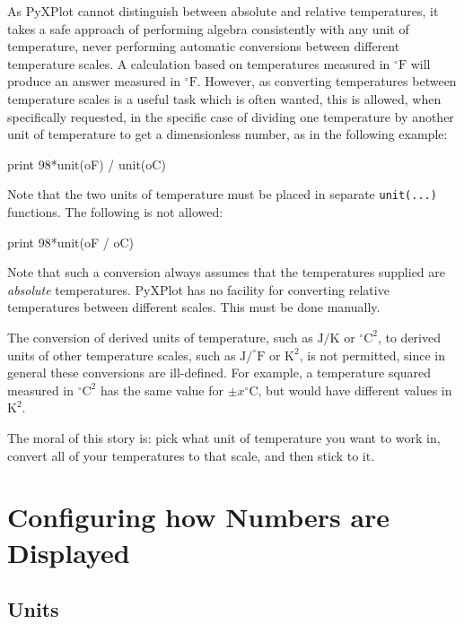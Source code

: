 As PyXPlot cannot distinguish between absolute and relative temperatures, it
takes a safe approach of performing algebra consistently with any unit of
temperature, never performing automatic conversions between different
temperature scales. A calculation based on temperatures measured in
$^\circ\mathrm{F}$ will produce an answer measured in $^\circ\mathrm{F}$.
However, as converting temperatures between temperature scales is a useful task
which is often wanted, this is allowed, when specifically requested, in the
specific case of dividing one temperature by another unit of temperature to get
a dimensionless number, as in the following example:

\begin{dodo}
print 98*unit(oF) / unit(oC)
\end{dodo}

\noindent Note that the two units of temperature must be placed in separate
{\tt unit(...)} functions. The following is not allowed:

\begin{dontdo}
print 98*unit(oF / oC)
\end{dontdo}

Note that such a conversion always assumes that the temperatures supplied are
{\it absolute} temperatures. PyXPlot has no facility for converting relative
temperatures between different scales. This must be done manually.

The conversion of derived units of temperature, such as $\mathrm{J}/\mathrm{K}$ or
$^\circ\mathrm{C}^2$, to derived units of other temperature scales, such as
$\mathrm{J}/^\circ\mathrm{F}$ or $\mathrm{K}^2$, is not permitted, since in
general these conversions are ill-defined. For example, a temperature squared
measured in $^\circ\mathrm{C}^2$ has the same value for $\pm
x^\circ\mathrm{C}$, but would have different values in $\mathrm{K}^2$.

The moral of this story is: pick what unit of temperature you want to work in,
convert all of your temperatures to that scale, and then stick to it.

\section{Configuring how Numbers are Displayed}
\label{sec:unitdisp}

\subsection{Units}

